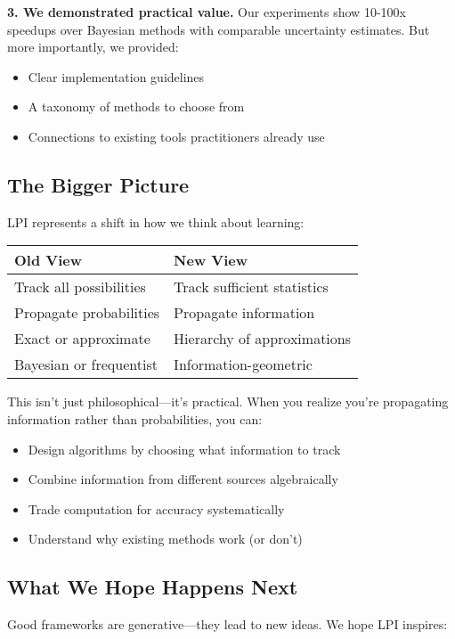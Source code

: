 \documentclass[11pt]{article}
\begin{document}
\textbf{3. We demonstrated practical value.} Our experiments show 10-100x speedups over Bayesian methods with comparable uncertainty estimates. But more importantly, we provided:
\begin{itemize}
\item Clear implementation guidelines
\item A taxonomy of methods to choose from
\item Connections to existing tools practitioners already use
\end{itemize}

\subsection{The Bigger Picture}

LPI represents a shift in how we think about learning:

\begin{center}
\begin{tabular}{ll}
\textbf{Old View} & \textbf{New View} \\
\hline
Track all possibilities & Track sufficient statistics \\
Propagate probabilities & Propagate information \\
Exact or approximate & Hierarchy of approximations \\
Bayesian or frequentist & Information-geometric \\
\end{tabular}
\end{center}

This isn't just philosophical—it's practical. When you realize you're propagating information rather than probabilities, you can:
\begin{itemize}
\item Design algorithms by choosing what information to track
\item Combine information from different sources algebraically
\item Trade computation for accuracy systematically
\item Understand why existing methods work (or don't)
\end{itemize}

\subsection{What We Hope Happens Next}

Good frameworks are generative—they lead to new ideas. We hope LPI inspires:
\end{document}
